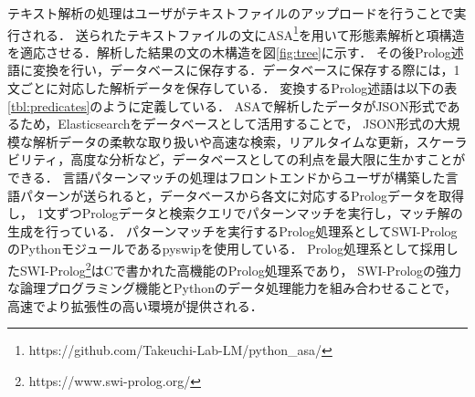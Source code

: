 \documentclass{FITpaper}
\begin{document}
テキスト解析の処理はユーザがテキストファイルのアップロードを行うことで実行される．
送られたテキストファイルの文にASA\footnote{https://github.com/Takeuchi-Lab-LM/python\_asa/}を用いて形態素解析と項構造を適応させる．解析した結果の文の木構造を図\ref{fig:tree}に示す．
その後Prolog述語に変換を行い，データベースに保存する．データベースに保存する際には，1文ごとに対応した解析データを保存している．
変換するProlog述語は以下の表\ref{tbl:predicates}のように定義している．%
ASAで解析したデータがJSON形式であるため，Elasticsearchをデータベースとして活用することで，
JSON形式の大規模な解析データの柔軟な取り扱いや高速な検索，リアルタイムな更新，スケーラビリティ，高度な分析など，データベースとしての利点を最大限に生かすことができる．
言語パターンマッチの処理はフロントエンドからユーザが構築した言語パターンが送られると，データベースから各文に対応するPrologデータを取得し，
1文ずつPrologデータと検索クエリでパターンマッチを実行し，マッチ解の生成を行っている．
パターンマッチを実行するProlog処理系としてSWI-PrologのPythonモジュールであるpyswipを使用している．
Prolog処理系として採用したSWI-Prolog\footnote{https://www.swi-prolog.org/}はCで書かれた高機能のProlog処理系であり，
SWI-Prologの強力な論理プログラミング機能とPythonのデータ処理能力を組み合わせることで，高速でより拡張性の高い環境が提供される．







\end{document}
